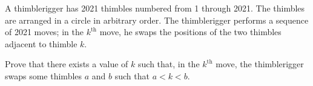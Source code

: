 A thimblerigger has 2021 thimbles numbered from 1 through 2021. The thimbles are arranged in a circle in arbitrary order. The thimblerigger performs a sequence of 2021 moves; in the $k^{\text{th}}$ move, he swaps the positions of the two thimbles adjacent to thimble $k$.

Prove that there exists a value of $k$ such that, in the $k^{\text{th}}$ move, the thimblerigger swaps some thimbles $a$ and $b$ such that $a < k < b$.
